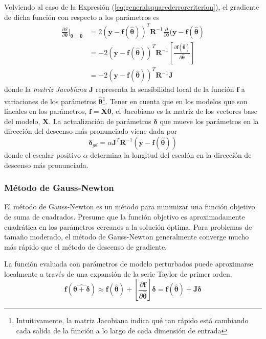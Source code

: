 Volviendo al caso de la Expresión (\ref{eq:generalsquarederrorcriterion}), el gradiente de dicha función con respecto a los parámetros es
\begin{align}
    \frac{\partial \mathscr{S}}{\partial \bm{\theta}}\bigg\rvert_{\bm{\theta}=\hat{\bm{\theta}}} &= 2(\bm{y} - \bm{f}(\hat{\bm{\theta}}))^T \bm{R}^{-1}\frac{\partial}{\partial \bm{\theta}}(\bm{y} - \bm{f}(\hat{\bm{\theta}}) \\
    &= -2(\bm{y} - \bm{f}(\hat{\bm{\theta}}))^T \bm{R}^{-1}\left[\frac{\partial \bm{f}(\hat{\bm{\theta}})}{\partial \hat{\bm{\theta}}}\right] \\
    &= -2(\bm{y} - \bm{f}(\hat{\bm{\theta}}))^T \bm{R}^{-1}\bm{J}
\end{align}
donde la \textit{matriz Jacobiana} $\bm{J}$ representa la sensibilidad local de la función $\bm{f}$ a variaciones de los parámetros $\hat{\bm{\theta}}$\footnote{Intuitivamente, la matriz Jacobiana indica qué tan rápido está cambiando cada salida de la función a lo largo de cada dimensión de entrada}. Tener en cuenta que en los modelos que son lineales en los parámetros, $\bm{f} = \bm{X}\bm{\theta}$, el Jacobiano es la matriz de los vectores base del modelo, $\bm{X}$. La actualización de parámetros $\bm{\delta}$ que mueve los parámetros en la dirección del descenso más pronunciado viene dada por
\begin{equation}
    \bm{\delta}_{gd} = \alpha\bm{J}^T\bm{R}^{-1}(\bm{y} - \bm{f}(\hat{\bm{\theta}}))
\end{equation}
donde el escalar positivo $\alpha$ determina la longitud del escalón en la dirección de descenso más pronunciada.

\subsubsection{Método de Gauss-Newton}
El método de Gauss-Newton es un método para minimizar una función objetivo de suma de cuadrados. Presume que la función objetivo es aproximadamente cuadrática en los parámetros cercanos a la solución óptima. Para problemas de tamaño moderado, el método de Gauss-Newton generalmente converge mucho más rápido que el método de descenso de gradiente.

La función evaluada con parámetros de modelo perturbados puede aproximarse localmente a través de una expansión de la serie Taylor de primer orden.
\begin{equation}
    \bm{f}(\hat{\bm{\theta}+\bm{\delta}}) \approx \bm{f}(\hat{\bm{\theta}}) + \left[\frac{\partial \bm{f}}{\partial \hat{\bm{\theta}}}\right]\bm{\delta} = \bm{f}(\hat{\bm{\theta}}) + \bm{J}\bm{\delta}
    \label{eq:gaussnewtontaylor}
\end{equation}


